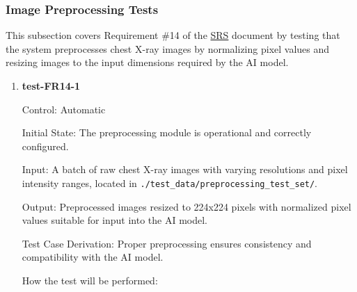 \documentclass[12pt, titlepage]{article}
\begin{document}
\subsubsection{Image Preprocessing Tests}

This subsection covers Requirement \#14 of the \href{https://github.com/RezaJodeiri/CXR-Capstone/blob/main/docs/SRS/SRS.pdf}{SRS} \citep{SRS}
document by testing that the system preprocesses chest X-ray images by normalizing pixel values and resizing images to the input dimensions required by the AI model.

\begin{enumerate}

\item \textbf{test-FR14-1} \label{test-FR14-1}

Control: Automatic

Initial State: The preprocessing module is operational and correctly configured.

Input: A batch of raw chest X-ray images with varying resolutions and pixel intensity ranges, located in \texttt{./test\_data/preprocessing\_test\_set/}.

Output: Preprocessed images resized to 224x224 pixels with normalized pixel values suitable for input into the AI model.

Test Case Derivation: Proper preprocessing ensures consistency and compatibility with the AI model.

How the test will be performed:


\end{enumerate}
\end{document}
